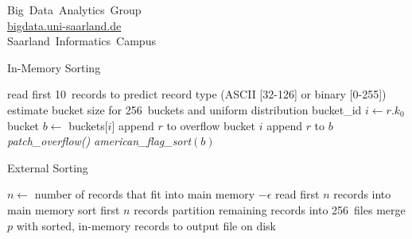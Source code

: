 \documentclass[a1paper,portrait,american,fontscale=.4]{baposter}
\begin{document}
\begin{poster}
\end{poster}
\vspace*{-6em}
\begin{flushright}
    \footnotesize
    Big~Data~Analytics~Group \\[.5em]
    \url{bigdata.uni-saarland.de} \\[.5em]
    Saarland~Informatics~Campus \\[.5em]
\end{flushright}
\clearpage
\todos

\begin{algorithm}
    \caption{In-Memory Sorting}
    \begin{algorithmic}
        \State read first 10~records to predict record type (ASCII [32-126] or binary [0-255])
        \State estimate bucket size for 256~buckets and uniform distribution
         
            \State bucket\_id $i \gets r.k_0$
            \State bucket $b \gets$ buckets[$i$]
             
                \State append $r$ to overflow bucket $i$
            \Else
                \State append $r$ to $b$
            \EndIf
        \EndFor
        \State \textit{patch\_overflow()}
         
            \State \emph{american\_flag\_sort}$(b)$
        \EndFor
    \end{algorithmic}
\end{algorithm}

\begin{algorithm}
    \caption{External Sorting}
    \begin{algorithmic}
        \State $n \gets$ number of records that fit into main memory $- \epsilon$
        \State read first $n$ records into main memory
        \State sort first $n$ records 
        \State partition remaining records into 256~files
            \State merge $p$ with sorted, in-memory records to output file on disk
        \EndFor
    \end{algorithmic}
\end{algorithm}
\end{document}
